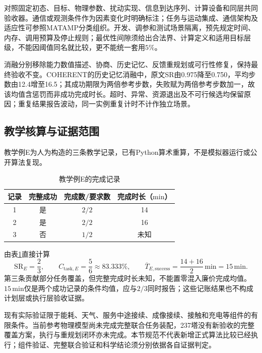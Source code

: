 对照固定初态、目标、物理参数、扰动实现、信息到达序列、计算设备和同层共同验收器。通信或观测条件作为因素变化时明确标注；任务与运动集成、通信架构及适应性可参照MATAMP分类组织\cite{MATAMP2026}。开发、调参和测试场景隔离，预先规定时间、内存、调用预算及停止规则；最优性间隙须给出合法界、计算定义和适用目标层级，不能因阈值同名就比较，更不能统一套用$5\%$。

消融分别移除能力数值描述、协商、历史记忆、反馈重规划或可行性修复，保持最终验收不变。COHERENT的历史记忆消融中，原文SR由0.975降至0.750，平均步数由12.4增至16.5；其成功期限为两倍参考步数，失败赋为两倍参考步数加一，故该均值含惩罚而非成功完成时长\cite{COHERENT2025}。超时、异常、资源退出及不可行候选均保留原因；重复结果报告波动，同一实例重复计时不计作独立场景。

\subsection{教学核算与证据范围}

教学例E为人为构造的三条教学记录，已有Python算术重算，不是模拟器运行或公开算法复现。
\begin{table}[htbp]
\centering
\caption{教学例E的完成记录}
\label{s0701:example}
\begin{tabular}{cccc}
\toprule
记录 & 完整成功 & 完成数/要求数 & 完成时长（$\mathrm{min}$）\\
\midrule
1 & 是 & $2/2$ & 14\\
2 & 是 & $2/2$ & 16\\
3 & 否 & $1/2$ & 未知\\
\bottomrule
\end{tabular}
\end{table}
由表\ref{s0701:example}直接计算
\begin{equation}
 \mathrm{SR}_{E}=\frac23,\qquad
 C_{\mathrm{task},E}=\frac56\approx83.333\%,\qquad
 \overline T_{E,\mathrm{success}}=\frac{14+16}{2}\,\mathrm{min}
 =15\,\mathrm{min}.
 \label{s0701:examplecalc}
\end{equation}
第三条贡献部分任务覆盖，但完整完成时长未知，不能置零混入廉价完成均值。$15\,\mathrm{min}$仅是两个成功记录的条件均值，应与$2/3$同时报告；这些记账结果也不构成计划层或执行层验收证据。

现有实际验证限于能耗、天气、服务中途接续、成像接续、接触和充电等组件的有限条件。当前参考物理模型尚未完成完整联合任务装配，237塔没有新验收的完整覆盖方案，执行与重规划闭环亦未完成。本节规范不代表新增正式算法比较已经执行；组件验证、完整联合验证和科学结论须分别依据各自证据判定。
